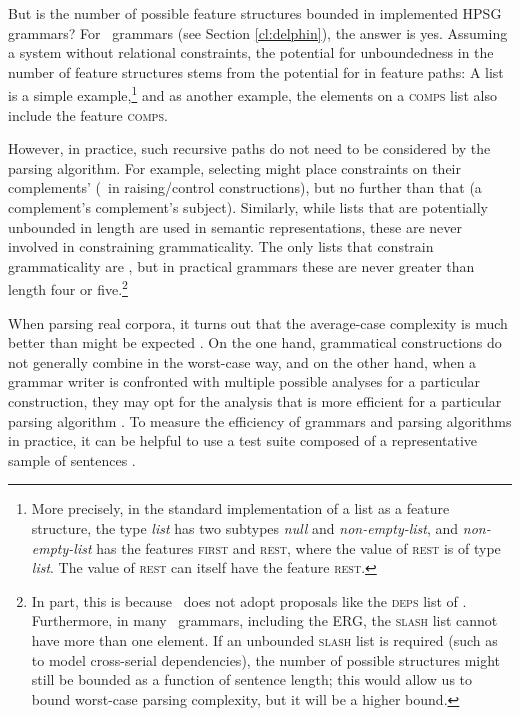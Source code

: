 \documentclass[output=paper,nonflat]{langsci/langscibook}
\begin{document}
But is the number of possible feature structures bounded
in implemented HPSG grammars?
For \delphin\ grammars (see Section \ref{cl:delphin}),
the answer is yes.
Assuming a system without relational constraints,
the potential for unboundedness in the number of feature structures
stems from the potential for  in feature paths:
A list is a simple example,\footnote{%
	More precisely, in the standard implementation of a list as a feature structure,
	the type \textit{list} has two subtypes \textit{null} and \textit{non-empty-list}, and
	\textit{non-empty-list} has the features \textsc{first}
	and \textsc{rest}, where the value of \textsc{rest} is of type \textit{list}.
	The value of \textsc{rest} can itself have the feature \textsc{rest}.
}
and as another example, the elements on a \textsc{comps} list
also include the feature \textsc{comps}.

However, in practice, such recursive paths do not need to be considered by the parsing algorithm.
For example, selecting  might place constraints on their complements' 
(\eg\ in raising/control constructions),
but no further than that (\eg a complement's complement's subject).
Similarly, while lists that are potentially unbounded in length are used in semantic representations,
these are never involved in constraining grammaticality.
The only lists that constrain grammaticality are ,
but in practical grammars these are never greater than length four or five.\footnote{%
	In part, this is because \delphin\ does not
	adopt proposals like the \textsc{deps} list of \citet*{BMS2001a-unlinked}.
	Furthermore, in many \delphin\ grammars, including the ERG,
	the \textsc{slash} list cannot have more than one element.
	If an unbounded \textsc{slash} list is required
	(such as to model cross-serial dependencies),
	the number of possible structures might still be bounded as a function of sentence length;
	this would allow us to bound worst-case parsing complexity,
	but it will be a higher bound.
}

When parsing real corpora,
it turns out that the average-case complexity is much better than might be expected \citep{Carroll94}.
On the one hand, grammatical constructions do not generally combine in the worst-case way,
and on the other hand, when a grammar writer is confronted
with multiple possible analyses for a particular construction,
they may opt for the analysis that is more efficient for a particular parsing algorithm \citep{Flickinger2000a}.
To measure the efficiency of grammars and parsing algorithms in practice,
it can be helpful to use a test suite composed of a representative sample of sentences \citep{OF98}.
\end{document}
